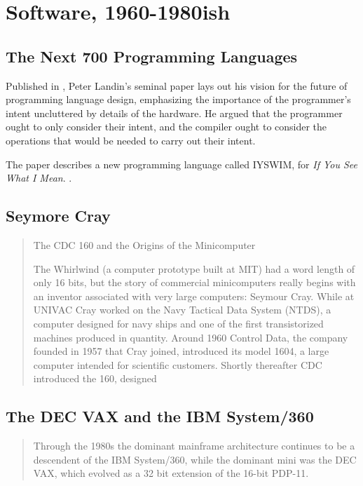 
\chapter{Software, 1960-1980ish}





\section{The Next 700 Programming Languages}

Published in \citeyear{landin_next_700_prog_langs_1966},
Peter Landin's seminal paper  lays out his vision for
the future of programming language design, emphasizing the importance of the programmer's intent
uncluttered by details of the hardware.
He argued that the programmer ought to only consider their intent, and the compiler ought to
consider the operations that would be needed to carry out their intent.

The paper describes a new programming language called IYSWIM, for \textit{If You See What I Mean}.
.

\section{Seymore Cray}
\begin{quotation}
	The CDC 160 and the Origins of the Minicomputer

	The Whirlwind (a computer prototype built at
	MIT) had a word length of only 16 bits, but the story of commercial minicomputers really begins with
	an inventor associated with very large computers: Seymour Cray. While at UNIVAC Cray worked on the
	Navy Tactical Data System (NTDS), a computer designed for navy ships and one of the first
	transistorized machines produced in quantity. Around 1960 Control Data, the company founded in 1957
	that Cray joined, introduced its model 1604, a large computer intended for scientific customers.
	Shortly thereafter CDC introduced the 160, designed
	\cite{nothing_new_since_von_neumann_2000}
\end{quotation}

\section{The DEC VAX and the IBM System/360}
\begin{quotation}
	Through the 1980s the dominant mainframe architecture continues to be a descendent of the IBM
	System/360, while the dominant mini was the DEC VAX, which evolved as a 32 bit extension of the
	16-bit PDP-11.
	\cite{nothing_new_since_von_neumann_2000}
\end{quotation}
